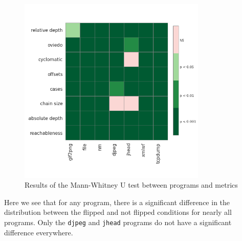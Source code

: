 \begin{figure}[H]
    \centering
    \includegraphics[width=0.8\textwidth]{5_results/graphs_new/mann_whitney_u_programs.png}  
    \caption{Results of the Mann-Whitney U test between programs and metrics}
    \label{fig:mann-whitney-program-metrics}
\end{figure}
Here we see that for any program, there is a significant difference in the distribution between the flipped and not flipped conditions for nearly all programs. Only the \texttt{djpeg} and \texttt{jhead} programs do not have a significant difference everywhere.

